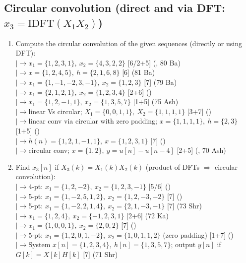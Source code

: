 \documentclass[12pt]{article}
\newcommand{\lb}{\\$\left|\rightarrow\right.$}
\begin{document}
  \subsection{Circular convolution (direct and via DFT: $x_3=\text{IDFT}(X_1X_2)$)}
    \begin{enumerate}[topsep=0pt, noitemsep]
      \item Compute the circular convolution of the given sequences (directly or using DFT):
        \lb $x_1=\{1,2,3,1\},\ x_2=\{4,3,2,2\}$ \hfill [6/2+5] (, 80 Ba)
        \lb $x=\{1,2,4,5\},\ h=\{2,1,6,8\}$ \hfill [6] (81 Ba)
        \lb $x_1=\{1,-1,-2,3,-1\},\ x_2=\{1,2,3\}$ \hfill [7] (79 Ba)
        \lb $x_1=\{2,1,2,1\},\ x_2=\{1,2,3,4\}$ \hfill [2+6] ()
        \lb $x_1=\{1,2,-1,1\},\ x_2=\{1,3,5,7\}$ \hfill [1+5] (75 Ash)
        \lb linear Vs circular; $X_1=\{0,0,1,1\},\ X_2=\{1,1,1,1\}$ \hfill [3+7] ()
        \lb linear conv via circular with zero padding; $x=\{1,1,1,1\},\ h=\{2,3\}$ \hfill [1+5] ()
        \lb $h(n)=\{1,2,1,-1,1\},\ x=\{1,2,3,1\}$ \hfill [7] ()
        \lb circular conv; $x=\{1,2\},\ y=u[n]-u[n-4]$ \hfill [2+5] (, 70 Ash)

      \item Find $x_3[n]$ if $X_3(k)=X_1(k)X_2(k)$ (product of DFTs $\Rightarrow$ circular convolution):
        \lb 4-pt: $x_1=\{1,2,-2\},\ x_2=\{1,2,3,-1\}$ \hfill [5/6] ()
        \lb 5-pt: $x_1=\{1,-2,5,1,2\},\ x_2=\{1,2,-3,-2\}$ \hfill [7] ()
        \lb 5-pt: $x_1=\{1,-2,2,1,4\},\ x_2=\{2,1,-3,-1\}$ \hfill [7] (73 Shr)
        \lb $x_1=\{1,2,4\},\ x_2=\{-1,2,3,1\}$ \hfill [2+6] (72 Ka)
        \lb $x_1=\{1,0,0,1\},\ x_2=\{2,0,2\}$ \hfill [7] ()
        \lb 5-pt: $x_1=\{1,2,0,1,-2\},\ x_2=\{1,0,1,1,2\}$ (zero padding) \hfill [1+7] ()
        \lb System $x[n]=\{1,2,3,4\},\ h[n]=\{1,3,5,7\}$; output $y[n]$ if $G[k]=X[k]H[k]$ \hfill [7] (71 Shr)
    \end{enumerate}
\end{document}
